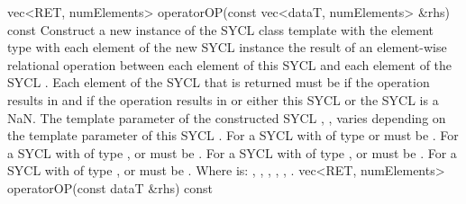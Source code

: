   \addRow
    {vec<RET, numElements> operatorOP(const vec<dataT, numElements> \&rhs) const}
    {
      Construct a new instance of the SYCL  class template with the element type  with each element of the new SYCL  instance the result of an element-wise  relational operation between each element of this SYCL  and each element of the  SYCL . Each element of the SYCL  that is returned must be  if the operation results in  and  if the operation results in  or either this SYCL  or the  SYCL  is a NaN.
      \newline \newline
      The  template parameter of the constructed SYCL , , varies depending on the  template parameter of this SYCL . For a SYCL  with  of type  or   must be . For a SYCL  with  of type ,  or   must be . For a SYCL  with  of type ,  or   must be . For a SYCL  with  of type ,  or   must be .
      \newline \newline
      Where  is: \codeinline{==}, \codeinline{!=}, \codeinline{<}, \codeinline{>}, \codeinline{<=}, \codeinline{>=}.
    }
  \addRow
    {vec<RET, numElements> operatorOP(const dataT \&rhs) const}
